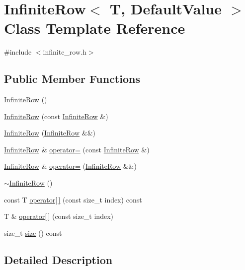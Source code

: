 \hypertarget{classInfiniteRow}{}\section{Infinite\+Row$<$ T, Default\+Value $>$ Class Template Reference}
\label{classInfiniteRow}


{\ttfamily \#include $<$infinite\+\_\+row.\+h$>$}

\subsection*{Public Member Functions}
\begin{DoxyCompactItemize}
\item 
\hyperlink{classInfiniteRow_ab5d574f96b18c889ce001aa54c7fc56f}{Infinite\+Row} ()
\item 
\hyperlink{classInfiniteRow_a818cfcb6cc36911994e51d1846bf0cb2}{Infinite\+Row} (const \hyperlink{classInfiniteRow}{Infinite\+Row} \&)
\item 
\hyperlink{classInfiniteRow_a4bbdbd72cb0f40ebf2ee2623bcf8b0ce}{Infinite\+Row} (\hyperlink{classInfiniteRow}{Infinite\+Row} \&\&)
\item 
\hyperlink{classInfiniteRow}{Infinite\+Row} \& \hyperlink{classInfiniteRow_a35e69c0b6ac47567481bcbf3f4b1d67e}{operator=} (const \hyperlink{classInfiniteRow}{Infinite\+Row} \&)
\item 
\hyperlink{classInfiniteRow}{Infinite\+Row} \& \hyperlink{classInfiniteRow_a312ede3dbebfcbf41f9e89d1d04fc93b}{operator=} (\hyperlink{classInfiniteRow}{Infinite\+Row} \&\&)
\item 
\hyperlink{classInfiniteRow_a35b43c388e4f3e980fbf823fbca37b36}{$\sim$\+Infinite\+Row} ()
\item 
const T \hyperlink{classInfiniteRow_a9a7b03df1b4f70b3472cb1dc0e4a15c5}{operator\mbox{[}$\,$\mbox{]}} (const size\+\_\+t index) const 
\item 
T \& \hyperlink{classInfiniteRow_aa505bb3c9c45f2880227d136e6563287}{operator\mbox{[}$\,$\mbox{]}} (const size\+\_\+t index)
\item 
size\+\_\+t \hyperlink{classInfiniteRow_a76e52c26ba4b10c0ff7852e6c449a51b}{size} () const 
\end{DoxyCompactItemize}


\subsection{Detailed Description}
